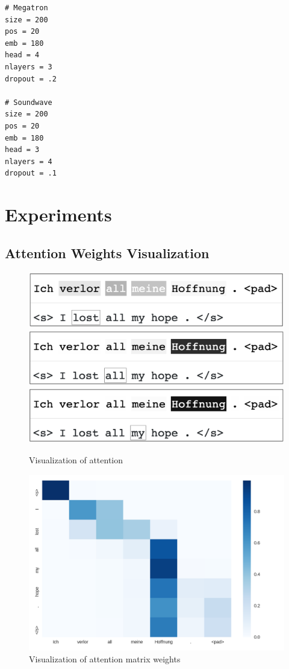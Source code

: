 \documentclass[12pt]{article}
\begin{document}
\begin{verbatim}
# Megatron
size = 200
pos = 20
emb = 180
head = 4
nlayers = 3
dropout = .2

# Soundwave
size = 200
pos = 20
emb = 180
head = 3
nlayers = 4
dropout = .1
\end{verbatim}

\section{Experiments}

\subsection{Attention Weights Visualization}
\begin{figure}
	\centering
	\includegraphics[width=.8\linewidth]{figs/attn1.png}
	\includegraphics[width=.8\linewidth]{figs/attn2.png}
	\includegraphics[width=.8\linewidth]{figs/attn3.png}
	\caption{Visualization of attention}
\end{figure}

\begin{figure}
	\centering
	\includegraphics[width=.8\linewidth]{figs/attn_mat.png}
	\caption{Visualization of attention matrix weights}
\end{figure}
\end{document}
